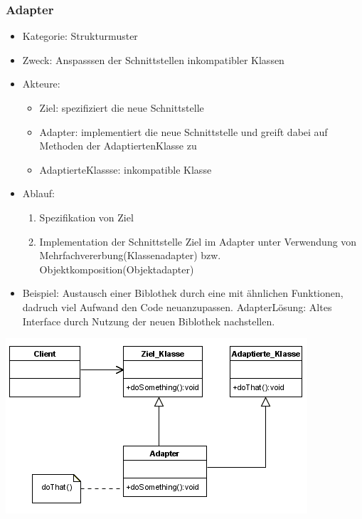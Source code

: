 \documentclass[11pt, fleqn, a4paper, leqno]{scrartcl} %
\begin{document}
		\subsubsection{Adapter}
			\begin{itemize}
				\item Kategorie: Strukturmuster
				\item Zweck: Anspasssen der Schnittstellen inkompatibler Klassen
				\item Akteure: 
				\begin{itemize}
					\item Ziel: spezifiziert die neue Schnittstelle
					\item Adapter: implementiert die neue Schnittstelle und greift dabei auf Methoden der AdaptiertenKlasse zu
					\item AdaptierteKlassse: inkompatible Klasse
				\end{itemize}
				\item Ablauf:
				\begin{enumerate}
					\item Spezifikation von Ziel
					\item Implementation der Schnittstelle Ziel im Adapter unter Verwendung von Mehrfachvererbung(Klassenadapter) bzw. Objektkomposition(Objektadapter)
				\end{enumerate}
				\item Beispiel: Austausch einer Biblothek durch eine mit ähnlichen Funktionen, dadruch viel Aufwand den Code neuanzupassen. AdapterLösung: Altes Interface durch Nutzung der neuen Biblothek nachstellen.
			\end{itemize}
			\includegraphics[scale=0.7]{images/adapter.png}
			\newpage
\end{document}
